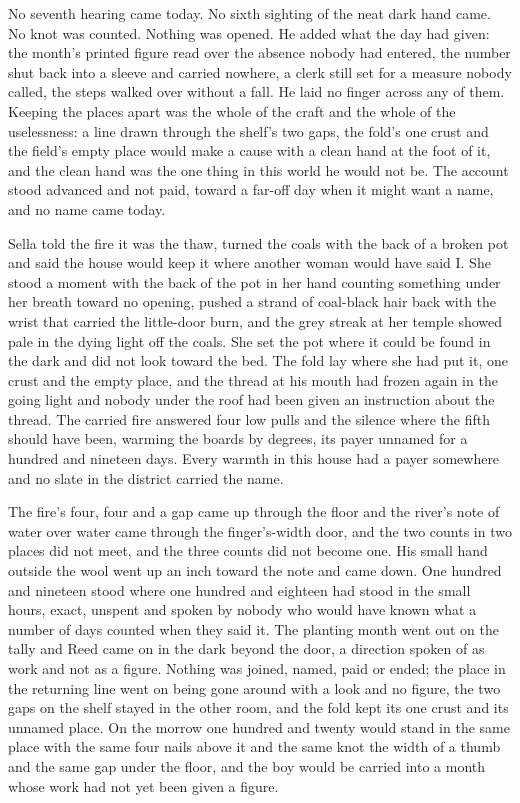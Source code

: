 No seventh hearing came today. No sixth sighting of the neat dark hand came. No knot was counted. Nothing was opened. He added what the day had given: the month's printed figure read over the absence nobody had entered, the number shut back into a sleeve and carried nowhere, a clerk still set for a measure nobody called, the steps walked over without a fall. He laid no finger across any of them. Keeping the places apart was the whole of the craft and the whole of the uselessness: a line drawn through the shelf's two gaps, the fold's one crust and the field's empty place would make a cause with a clean hand at the foot of it, and the clean hand was the one thing in this world he would not be. The account stood advanced and not paid, toward a far-off day when it might want a name, and no name came today.

Sella told the fire it was the thaw, turned the coals with the back of a broken pot and said the house would keep it where another woman would have said I. She stood a moment with the back of the pot in her hand counting something under her breath toward no opening, pushed a strand of coal-black hair back with the wrist that carried the little-door burn, and the grey streak at her temple showed pale in the dying light off the coals. She set the pot where it could be found in the dark and did not look toward the bed. The fold lay where she had put it, one crust and the empty place, and the thread at his mouth had frozen again in the going light and nobody under the roof had been given an instruction about the thread. The carried fire answered four low pulls and the silence where the fifth should have been, warming the boards by degrees, its payer unnamed for a hundred and nineteen days. Every warmth in this house had a payer somewhere and no slate in the district carried the name.

The fire's four, four and a gap came up through the floor and the river's note of water over water came through the finger's-width door, and the two counts in two places did not meet, and the three counts did not become one. His small hand outside the wool went up an inch toward the note and came down. One hundred and nineteen stood where one hundred and eighteen had stood in the small hours, exact, unspent and spoken by nobody who would have known what a number of days counted when they said it. The planting month went out on the tally and Reed came on in the dark beyond the door, a direction spoken of as work and not as a figure. Nothing was joined, named, paid or ended; the place in the returning line went on being gone around with a look and no figure, the two gaps on the shelf stayed in the other room, and the fold kept its one crust and its unnamed place. On the morrow one hundred and twenty would stand in the same place with the same four nails above it and the same knot the width of a thumb and the same gap under the floor, and the boy would be carried into a month whose work had not yet been given a figure.
